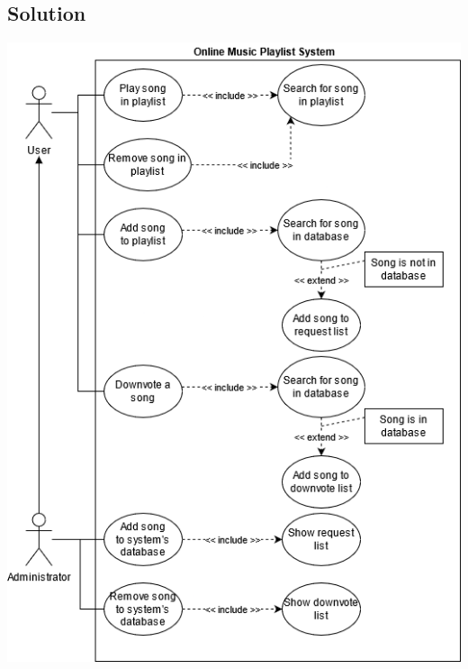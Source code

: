 \documentclass{article}
\begin{document}
    \subsection*{Solution}

    \begin{center}
        \includegraphics[scale=0.53]{Exercise02_Problem2.png}
    \end{center}
\end{document}
